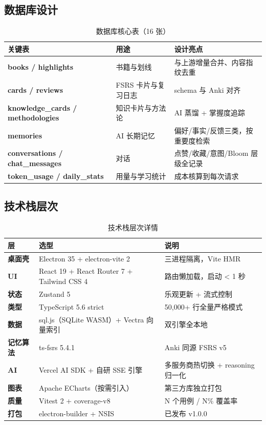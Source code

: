 \documentclass[12pt,a4paper,nomath]{harryopo-report}
\begin{document}
\subsection{数据库设计}
\begin{table}[htbp]
\centering
\begin{tabularx}{\textwidth}{>{\bfseries}l X X}
\toprule
\textbf{关键表} & \textbf{用途} & \textbf{设计亮点} \\
\midrule
books / highlights & 书籍与划线 & 与上游增量合并、内容指纹去重 \\
cards / reviews & FSRS 卡片与复习日志 & schema 与 Anki 对齐 \\
knowledge\_cards / methodologies & 知识卡片与方法论 & AI 蒸馏 + 掌握度追踪 \\
memories & AI 长期记忆 & 偏好/事实/反馈三类，按重要度检索 \\
conversations / chat\_messages & 对话 & 点赞/收藏/意图/Bloom 层级全记录 \\
token\_usage / daily\_stats & 用量与学习统计 & 成本核算到每次请求 \\
\bottomrule
\end{tabularx}
\caption{数据库核心表（16 张）}
\label{tab:database}
\end{table}

\subsection{技术栈层次}
\begin{table}[htbp]
\centering
\begin{tabularx}{\textwidth}{>{\bfseries}l X X}
\toprule
\textbf{层} & \textbf{选型} & \textbf{说明} \\
\midrule
桌面壳 & Electron 35 + electron-vite 2 & 三进程隔离，Vite HMR \\
UI & React 19 + React Router 7 + Tailwind CSS 4 & 路由懒加载，启动 < 1 秒 \\
状态 & Zustand 5 & 乐观更新 + 流式控制 \\
类型 & TypeScript 5.6 strict & 50,000+ 行全量严格模式 \\
数据 & sql.js（SQLite WASM）+ Vectra 向量索引 & 双引擎全本地 \\
记忆算法 & ts-fsrs 5.4.1 & Anki 同源 FSRS v5 \\
AI & Vercel AI SDK + 自研 SSE 引擎 & 多服务商热切换 + reasoning 归一化 \\
图表 & Apache ECharts（按需引入） & 第三方库独立打包 \\
质量 & Vitest 2 + coverage-v8 & N 个用例 / N\% 覆盖率 \\
打包 & electron-builder + NSIS & 已发布 v1.0.0 \\
\bottomrule
\end{tabularx}
\caption{技术栈层次详情}
\label{tab:tech-stack}
\end{table}
\end{document}
